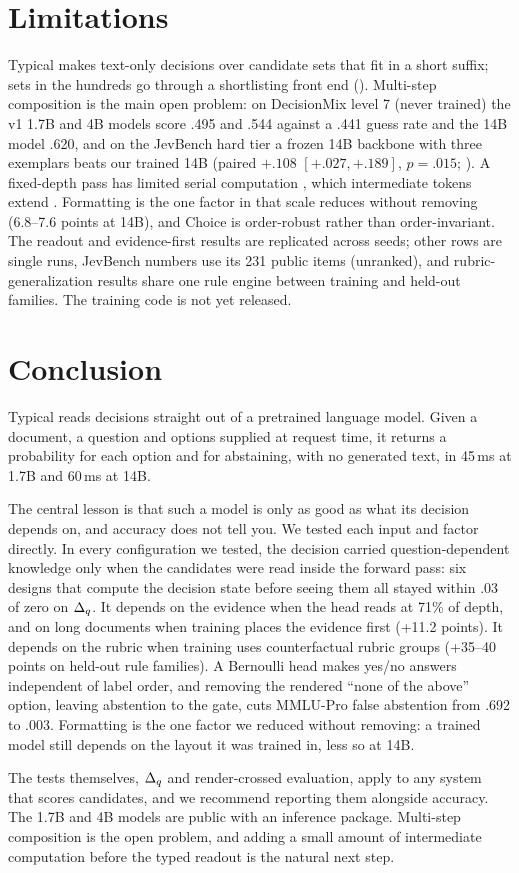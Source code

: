 \section{Limitations}
\label{sec:limitations}

Typical makes text-only decisions over candidate sets that fit in a short suffix; sets in the hundreds
go through a shortlisting front end (). Multi-step composition is the main open
problem: on DecisionMix level 7 (never trained) the v1 1.7B and 4B models score .495 and .544 against a
.441 guess rate and the 14B model .620, and on the JevBench hard tier a frozen 14B backbone with three
exemplars beats our trained 14B (paired $+.108$ $[+.027, +.189]$, $p = .015$; ). A
fixed-depth pass has limited serial computation \citep{merrill2023parallelism}, which intermediate
tokens extend \citep{merrill2024expressive,feng2023chain}. Formatting is the one factor in
 that scale reduces without removing (6.8--7.6 points at 14B), and Choice is
order-robust rather than order-invariant. The readout and evidence-first results are replicated across
seeds; other rows are single runs, JevBench numbers use its 231 public items (unranked), and
rubric-generalization results share one rule engine between training and held-out families. The
training code is not yet released.

\section{Conclusion}
\label{sec:conclusion}

Typical reads decisions straight out of a pretrained language model. Given a document, a question and
options supplied at request time, it returns a probability for each option and for abstaining, with no
generated text, in 45\,ms at 1.7B and 60\,ms at 14B.

The central lesson is that such a model is only as good as what its decision depends on, and accuracy
does not tell you. We tested each input and factor directly. In every configuration we tested, the decision carried
question-dependent knowledge only when the candidates were read inside the forward pass: six designs that compute the
decision state before seeing them all stayed within .03 of zero on $\Delta_q$. It depends on the evidence when the head reads at
71\% of depth, and on long documents when training places the evidence first (+11.2 points). It depends
on the rubric when training uses counterfactual rubric groups (+35--40 points on held-out rule
families). A Bernoulli head makes yes/no answers independent of label order, and removing the rendered ``none of the above'' option, leaving abstention to the gate, cuts MMLU-Pro
false abstention from .692 to .003. Formatting is the one factor we reduced without removing: a trained
model still depends on the layout it was trained in, less so at 14B.

The tests themselves, $\Delta_q$ and render-crossed evaluation, apply to any system that scores candidates,
and we recommend reporting them alongside accuracy. The 1.7B and 4B models are public with an inference
package. Multi-step composition is the open problem, and adding a small amount of intermediate
computation before the typed readout is the natural next step.
